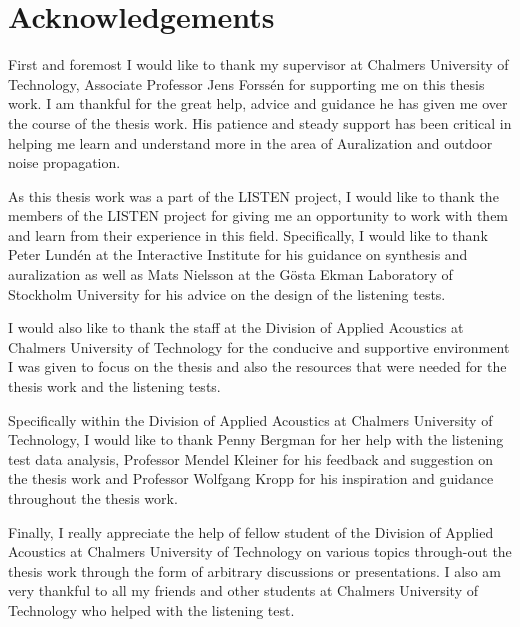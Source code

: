 \chapter*{Acknowledgements}

First and foremost I would like to thank my supervisor at Chalmers University of Technology,   Associate Professor Jens Forss\'{e}n for supporting me on this thesis work. I am thankful for the great help, advice and guidance he has given me over the course of the thesis work. His patience and steady support has been critical in helping me learn and understand more in the area of Auralization and outdoor noise propagation.

As this thesis work was a part of the LISTEN project, I would like to thank the members of the LISTEN project for giving me an opportunity to work with them and learn from their experience in this field. Specifically, I would like to thank Peter Lund\'{e}n at the Interactive Institute for his guidance on synthesis and auralization as well as Mats Nielsson at the G\"{o}sta Ekman Laboratory of Stockholm University for his advice on the design of the listening tests.

I would also like to thank the staff at the Division of Applied Acoustics at Chalmers University of Technology for the conducive and supportive environment I was given to focus on the thesis and also the resources that were needed for the thesis work and the listening tests.

Specifically within the Division of Applied Acoustics at Chalmers University of Technology, I would like to thank Penny Bergman for her help with the listening test data analysis, Professor Mendel Kleiner for his feedback and suggestion on the thesis work and Professor Wolfgang Kropp for his inspiration and guidance throughout the thesis work.

Finally, I really appreciate the help of fellow student of the Division of Applied Acoustics at Chalmers University of Technology on various topics through-out the thesis work through the form of arbitrary discussions or presentations. I also am very thankful to all my friends and other students at Chalmers University of Technology who helped with the listening test. 



